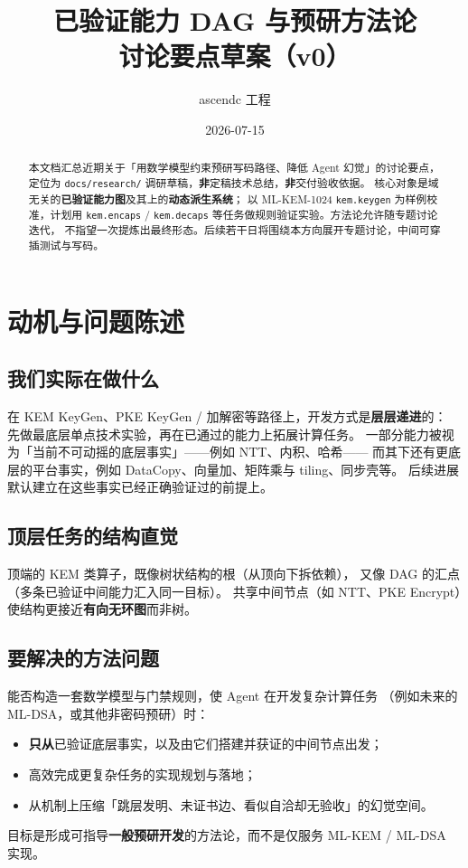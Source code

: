\documentclass[UTF8,a4paper,11pt]{ctexart}
\title{已验证能力 DAG 与预研方法论\\{\large 讨论要点草案（v0）}}
\author{ascendc 工程}
\date{2026-07-15}
\begin{document}
\maketitle

\begin{abstract}
本文档汇总近期关于「用数学模型约束预研写码路径、降低 Agent 幻觉」的讨论要点，
定位为 \texttt{docs/research/} 调研草稿，\textbf{非}定稿技术总结，\textbf{非}交付验收依据。
核心对象是域无关的\textbf{已验证能力图}及其上的\textbf{动态派生系统}；
以 ML-KEM-1024 \texttt{kem.keygen} 为样例校准，计划用 \texttt{kem.encaps} /
\texttt{kem.decaps} 等任务做规则验证实验。方法论允许随专题讨论迭代，
不指望一次提炼出最终形态。后续若干日将围绕本方向展开专题讨论，中间可穿插测试与写码。
\end{abstract}

\tableofcontents
\newpage

\section{动机与问题陈述}

\subsection{我们实际在做什么}
在 KEM KeyGen、PKE KeyGen / 加解密等路径上，开发方式是\textbf{层层递进}的：
先做最底层单点技术实验，再在已通过的能力上拓展计算任务。
一部分能力被视为「当前不可动摇的底层事实」——例如 NTT、内积、哈希——
而其下还有更底层的平台事实，例如 DataCopy、向量加、矩阵乘与 tiling、同步壳等。
后续进展默认建立在这些事实已经正确验证过的前提上。

\subsection{顶层任务的结构直觉}
顶端的 KEM 类算子，既像树状结构的根（从顶向下拆依赖），
又像 DAG 的汇点（多条已验证中间能力汇入同一目标）。
共享中间节点（如 NTT、PKE Encrypt）使结构更接近\textbf{有向无环图}而非树。

\subsection{要解决的方法问题}
能否构造一套数学模型与门禁规则，使 Agent 在开发复杂计算任务
（例如未来的 ML-DSA，或其他非密码预研）时：
\begin{itemize}
  \item \textbf{只从}已验证底层事实，以及由它们搭建并获证的中间节点出发；
  \item 高效完成更复杂任务的实现规划与落地；
  \item 从机制上压缩「跳层发明、未证书边、看似自洽却无验收」的幻觉空间。
\end{itemize}
目标是形成可指导\textbf{一般预研开发}的方法论，而不是仅服务 ML-KEM / ML-DSA 实现。
\end{document}
